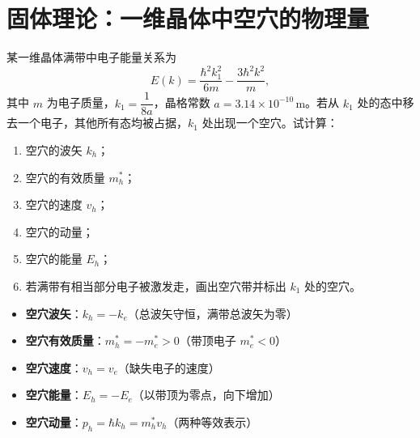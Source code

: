 \section{固体理论：一维晶体中空穴的物理量}
\label{sec:hole-properties}

\begin{modelbox}[题目：满带中移去电子后空穴各物理量的计算]
某一维晶体满带中电子能量关系为
\[
E(k)=\frac{\hbar^2k_1^2}{6m}-\frac{3\hbar^2k^2}{m},
\]
其中 $m$ 为电子质量，$k_1=\dfrac{1}{8a}$，晶格常数 $a=3.14\times10^{-10}\,\text{m}$。若从 $k_1$ 处的态中移去一个电子，其他所有态均被占据，$k_1$ 处出现一个空穴。试计算：
\begin{enumerate}
    \item 空穴的波矢 $k_h$；
    \item 空穴的有效质量 $m_h^*$；
    \item 空穴的速度 $v_h$；
    \item 空穴的动量；
    \item 空穴的能量 $E_h$；
    \item 若满带有相当部分电子被激发走，画出空穴带并标出 $k_1$ 处的空穴。
\end{enumerate}
\end{modelbox}

\begin{tipbox}[考点快速分析]
\begin{itemize}
    \item \textbf{空穴波矢}：$k_h=-k_e$（总波矢守恒，满带总波矢为零）
    \item \textbf{空穴有效质量}：$m_h^*=-m_e^*>0$（带顶电子 $m_e^*<0$）
    \item \textbf{空穴速度}：$v_h=v_e$（缺失电子的速度）
    \item \textbf{空穴能量}：$E_h=-E_e$（以带顶为零点，向下增加）
    \item \textbf{空穴动量}：$p_h=\hbar k_h=m_h^*v_h$（两种等效表示）
\end{itemize}
\end{tipbox}

